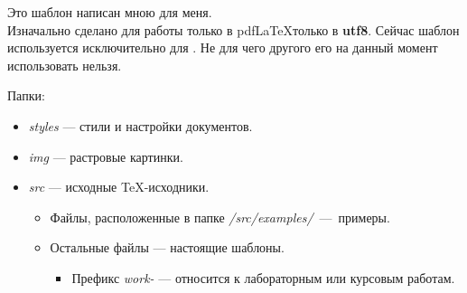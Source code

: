 

Это шаблон написан мною для меня.\\
Изначально сделано для работы только в pdf\LaTeX только в \textbf{utf8}.
Сейчас шаблон используется исключительно для  \XeTeX.
Не для чего другого его на данный момент использовать нельзя.

Папки: 
\begin{itemize}
	\item \textit{styles} --- стили и настройки документов.
	\item \textit{img} --- растровые картинки.
	\item \textit{src} --- исходные \TeX-исходники.
	\begin{itemize}
		\item Файлы, расположенные в папке \textit{/src/examples/}~---~примеры.
		\item Остальные файлы --- настоящие шаблоны.
		\begin{itemize}
			\item Префикс \textit{work-} --- относится к лабораторным или курсовым работам.
		\end{itemize}	
	\end{itemize}
\end{itemize}


\pagebreak

